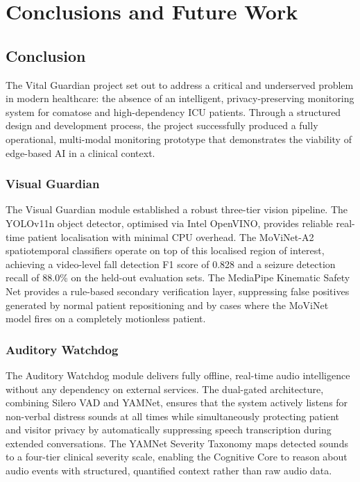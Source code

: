 \chapter{Conclusions and Future Work}
\label{chap:conclusions}

\section{Conclusion}
\label{sec:conclusion}

The Vital Guardian project set out to address a critical and underserved problem
in modern healthcare: the absence of an intelligent, privacy-preserving monitoring
system for comatose and high-dependency ICU patients. Through a structured design
and development process, the project successfully produced a fully operational,
multi-modal monitoring prototype that demonstrates the viability of edge-based
AI in a clinical context.

\subsection{Visual Guardian}

The Visual Guardian module established a robust three-tier vision pipeline. The
YOLOv11n object detector, optimised via Intel OpenVINO, provides reliable real-time
patient localisation with minimal CPU overhead. The MoViNet-A2 spatiotemporal
classifiers operate on top of this localised region of interest, achieving a
video-level fall detection F1 score of 0.828 and a seizure detection recall of
88.0\% on the held-out evaluation sets. The MediaPipe Kinematic Safety Net
provides a rule-based secondary verification layer, suppressing false positives
generated by normal patient repositioning and by cases where the MoViNet model
fires on a completely motionless patient.

\subsection{Auditory Watchdog}

The Auditory Watchdog module delivers fully offline, real-time audio intelligence
without any dependency on external services. The dual-gated architecture, combining
Silero VAD and YAMNet, ensures that the system actively listens for non-verbal
distress sounds at all times while simultaneously protecting patient and visitor
privacy by automatically suppressing speech transcription during extended
conversations. The YAMNet Severity Taxonomy maps detected sounds to a
four-tier clinical severity scale, enabling the Cognitive Core to reason about
audio events with structured, quantified context rather than raw audio data.

